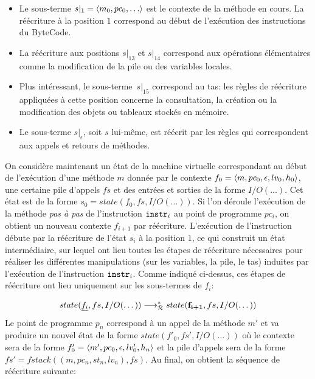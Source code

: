 \begin{itemize}
\item Le sous-terme $s|_1 = \la m_0, pc_0, \dots \ra$ est le contexte
  de la méthode en cours. La réécriture à la position $1$ correspond au début de
  l'exécution des instructions du ByteCode.

\item La réécriture aux positions $s|_{13}$ et $s|_{14}$ correspond
  aux opérations élémentaires comme la modification de la pile ou des
  variables locales. %
  
\item Plus intéressant, le sous-terme~$s|_{15}$ correspond au tas: les
  règles de réécriture appliquées à cette position concerne la
  consultation, la création ou la modification des objets ou tableaux
  stockés en mémoire.

\item Le sous-terme $s|_\epsilon$, soit $s$ lui-même, est réécrit par les
  règles qui correspondent aux appels et retours de méthodes.
\end{itemize}

On considère maintenant un état de la machine virtuelle correspondant
au début de l'exécution d'une méthode $m$ donnée par le contexte $f_0 =
\langle m, pc_0, \epsilon, lv_0, h_0\rangle$, une certaine pile d'appels $fs$
et des entrées et sorties de la forme $I/O(\dots)$.  Cet état est de la
forme $s_0 = state(f_0, fs, I/O(\dots))$. Si l'on déroule l'exécution de
la méthode \emph{pas à pas} de l'instruction $\mathtt{instr}_i$ au point de
programme $pc_i$, on obtient un nouveau contexte $f_{i+1}$ par
réécriture. L'exécution de l'instruction débute par la réécriture de
l'état $s_i$ à la position $1$, ce qui construit un état intermédiaire, sur
lequel ont lieu toutes les étapes de réécriture nécessaires pour
réaliser les différentes manipulations (sur les variables, la pile, le
tas) induites par l'exécution de l'instruction $\mathtt{instr}_i$. Comme
indiqué ci-dessus, ces étapes de réécriture ont lieu uniquement sur
les sous-termes de $f_i$: %

\textit{
\[ state(\underline{f_i}, fs, I/O(\dots)) \longrightarrow_\mathcal R^* state(\textbf{f}_\textbf{i+1}, {fs}, I/O(\dots)) \]
}
Le point de programme $p_n$ correspond à un appel de la méthode
$m'$ et va produire un nouvel état de la forme $state(f'_0, fs',
I/O(\dots))$ où le contexte sera de la forme $f'_0 = \langle m', pc_0,
\epsilon, lv'_0, h_n \rangle$ et la pile d'appels sera de la forme $fs' = fstack((m, pc_n, st_n,
lv_n), fs)$. Au final, on obtient la séquence de réécriture suivante:

